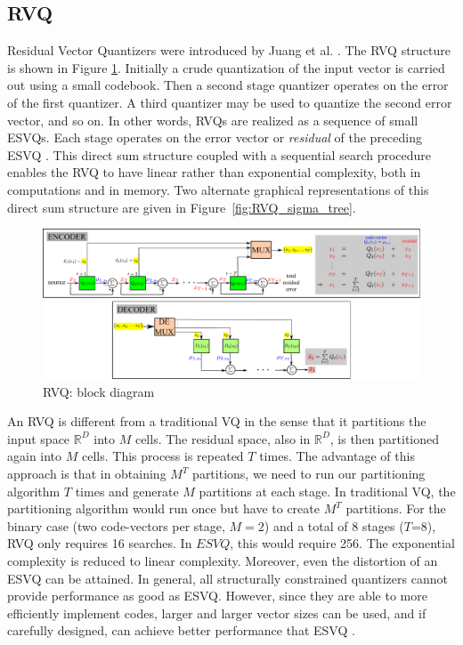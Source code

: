 \begin{Body}
\subsection{RVQ}
Residual Vector Quantizers were introduced by Juang et al. \cite{1982_CNF_SpeechRVQ_JuangGray}.  The RVQ structure is shown in Figure \ref{fig:RVQ_block_diagram}.  Initially a crude quantization of the input vector is carried out using a small codebook.  Then a second stage quantizer operates on the error of the first quantizer.  A third quantizer may be used to quantize the second error vector, and so on.  In other words, RVQs are realized as a sequence of small ESVQs.  Each stage operates on the error vector or \emph{residual} of the preceding ESVQ \cite{1991_CNF_DesignPerformanceRVQ_Frost}.  This direct sum structure coupled with a sequential search procedure enables the RVQ to have linear rather than exponential complexity, both in computations and in memory.  Two alternate graphical representations of this direct sum structure are given in Figure~\ref{fig:RVQ_sigma_tree}.

\begin{figure}				
	\includegraphics[width=1\textwidth]{thesis/RVQ_blockDiagram.pdf}
	\caption{RVQ: block diagram}
	\label{fig:RVQ_block_diagram}
\end{figure}

An RVQ is different from a traditional VQ in the sense that it partitions the input space $\mathbb{R}^D$ into $M$ cells.  The residual space, also in $\mathbb{R}^D$, is then partitioned again into $M$ cells.  This process is repeated $T$ times.  The advantage of this approach is that in obtaining $M^T$ partitions, we need to run our partitioning algorithm $T$ times and generate $M$ partitions at each stage.  In traditional VQ, the partitioning algorithm would run once but have to create $M^T$ partitions.  For the binary case (two code-vectors per stage, $M=2$) and a total of 8 stages ($T$=8), RVQ only requires 16 searches.  In $ESVQ$, this would require 256.  The exponential complexity is reduced to linear complexity.  Moreover, even the distortion of an ESVQ can be attained.  In general, all structurally constrained quantizers cannot provide performance as good as ESVQ.  However, since they are able to more efficiently implement codes, larger and larger vector sizes can be used, and if carefully designed, can achieve better performance that ESVQ \cite{1996_JNL_AdvancesRVQ_Barnes}.


\end{Body}
